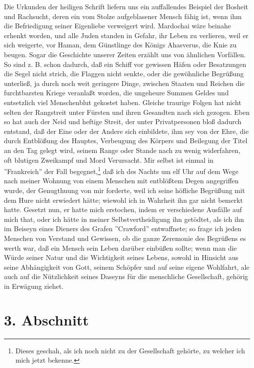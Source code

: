 Die Urkunden der heiligen Schrift liefern uns ein auffallendes Beispiel der
Bosheit und Rachsucht, deren ein vom Stolze aufgeblasener Mensch fähig ist, wenn
ihm die Befriedigung seiner Eigenliebe verweigert wird. Mardochai wäre beinahe
erhenkt worden, und alle Juden standen in Gefahr, ihr Leben zu verlieren, weil
er sich weigerte, vor Haman, dem Günstlinge des Königs Ahasverus, die Knie zu
beugen. Sogar die Geschichte unserer Zeiten erzählt uns von ähnlichen Vorfällen.
So sind z. B. schon dadurch, daß ein Schiff vor gewissen Häfen oder Besatzungen
die Segel nicht strich, die Flaggen nicht senkte, oder die gewöhnliche Begrüßung
unterließ, ja durch noch weit geringere Dinge, zwischen Staaten und Reichen die
furchtbarsten Kriege veranlaßt worden, die ungeheure Summen Geldes und
entsetzlich viel Menschenblut gekostet haben. Gleiche traurige Folgen hat nicht
selten der Rangstreit unter Fürsten und ihren Gesandten nach sich gezogen. Eben
so hat auch der Neid und heftige Streit, der unter Privatpersonen bloß dadurch
entstand, daß der Eine oder der Andere sich einbildete, ihm sey von der Ehre,
die durch Entblößung des Hauptes, Verbeugung des Körpers und Beilegung der Titel
an den Tag gelegt wird, seinem Range oder Stande nach zu wenig widerfahren, oft
blutigen Zweikampf und Mord Verursacht. Mir selbst ist einmal in ''Frankreich''
der Fall begegnet,\footnote{Dieses geschah, als ich noch nicht zu der
Gesellschaft gehörte, zu welcher ich mich jetzt bekenne.} daß ich des Nachts um
elf Uhr auf dem Wege nach meiner Wohnung von einem Menschen mit entblößtem Degen
angegriffen wurde, der Genugthuung von mir forderte, weil ich seine höfliche
Begrüßung mit dem Hure nicht erwiedert hätte; wiewohl ich in Wahrheit ihn gar
nicht bemerkt hatte. Gesetzt nun, er hatte mich erstochen, indem er verschiedene
Ausfälle auf mich that, oder ich hätte in meiner Selbstvertheidigung ihn
getödtet, als ich ihn im Beiseyn eines Dieners des Grafen ''Crawford''
entwaffnete; so frage ich jeden Menschen von Verstand und Gewissen, ob die ganze
Zeremonie des Begrüßens es werth war, daß ein Mensch sein Leben darüber einbüßen
sollte; wenn man die Würde seiner Natur und die Wichtigkeit seines Lebens,
sowohl in Hinsicht aus seine Abhängigkeit von Gott, seinem Schöpfer und auf
seine eigene Wohlfahrt, ale auch auf die Nützlichkeit seines Daseyns für die
menschliche Gesellschaft, gehörig in Erwägung ziehet.

\section{3. Abschnitt} \label{kap9_ab3}

